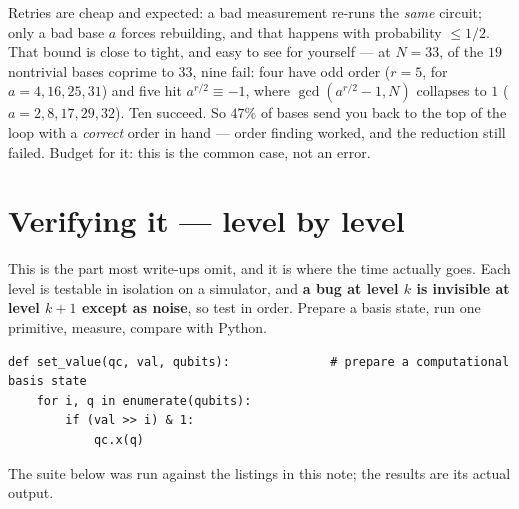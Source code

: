 \documentclass[11pt]{article}
\theoremstyle{plain}
\theoremstyle{remark}
\begin{document}
Retries are cheap and expected: a bad measurement re-runs the \emph{same} circuit; only a bad base
$a$ forces rebuilding, and that happens with probability $\le1/2$. That bound is close to tight,
and easy to see for yourself --- at $N=33$, of the $19$ nontrivial bases coprime to $33$, nine
fail: four have odd order ($r=5$, for $a=4,16,25,31$) and five hit $a^{r/2}\equiv-1$, where
$\gcd(a^{r/2}{-}1,N)$ collapses to $1$ ($a=2,8,17,29,32$). Ten succeed. So $47\%$ of bases send you
back to the top of the loop with a \emph{correct} order in hand --- order finding worked, and the
reduction still failed. Budget for it: this is the common case, not an error.

\section{Verifying it --- level by level}\label{im:sec:test}

This is the part most write-ups omit, and it is where the time actually goes. Each level is testable
in isolation on a simulator, and \textbf{a bug at level $k$ is invisible at level $k+1$ except as
noise}, so test in order. Prepare a basis state, run one primitive, measure, compare with Python.

\begin{lstlisting}
def set_value(qc, val, qubits):              # prepare a computational basis state
    for i, q in enumerate(qubits):
        if (val >> i) & 1:
            qc.x(q)
\end{lstlisting}

The suite below was run against the listings in this note; the results are its actual output.
\end{document}
